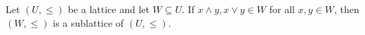 Let $(U, \leq)$ be a lattice and let $W \subseteq U$. If $x \wedge y, x \vee y \in W$ for all $x, y \in W$, then $(W, \leq)$ is a sublattice of $(U, \leq)$.

